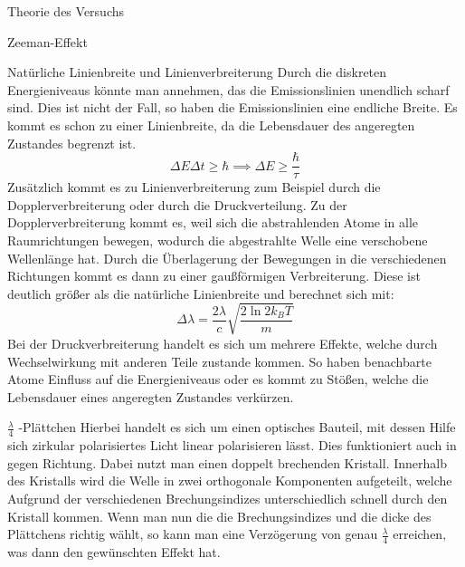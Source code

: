 \documentclass[pdftex, a4paper,11pt, twoside, ngerman]{report}
\begin{document}
\begin{chapter}{Theorie des Versuchs}
\begin{section}{Zeeman-Effekt}
      \begin{subsection}{Natürliche Linienbreite und Linienverbreiterung}
        Durch die diskreten Energieniveaus könnte man annehmen, das die
        Emissionslinien unendlich scharf sind. Dies ist nicht der Fall, so haben
        die Emissionslinien eine endliche Breite. Es kommt es schon zu einer
        Linienbreite, da die Lebensdauer des angeregten Zustandes begrenzt ist.
        \begin{equation}
          \label{eq:Linienbreite1}
          \Delta E\Delta t \geq \hbar \implies \Delta E \geq \frac \hbar\tau
        \end{equation}
        Zusätzlich kommt es zu Linienverbreiterung zum Beispiel durch die Dopplerverbreiterung oder durch die Druckverteilung.
        Zu der Dopplerverbreiterung kommt es, weil sich die abstrahlenden Atome
        in alle Raumrichtungen bewegen, wodurch die abgestrahlte Welle eine
        verschobene Wellenlänge hat. Durch die Überlagerung der Bewegungen in
        die verschiedenen Richtungen kommt es dann zu einer gaußförmigen
        Verbreiterung. Diese ist deutlich größer als die natürliche Linienbreite
        und berechnet sich mit:
        \begin{equation}
          \label{eq:Linienbreite2}
          \Delta\lambda = \frac{2\lambda}{c}\sqrt{\frac{2\ln 2k_B T}{m}}
        \end{equation}
        Bei der Druckverbreiterung handelt es sich um mehrere Effekte, welche
        durch Wechselwirkung mit anderen Teile zustande kommen. So haben
        benachbarte Atome Einfluss auf die Energieniveaus oder es kommt zu
        Stößen, welche die Lebensdauer eines angeregten Zustandes verkürzen.
        
        \end{subsection}
      
      
      
      \begin{subsection}{$\frac{\lambda}{4}$ -Plättchen}
        Hierbei handelt es sich um einen optisches Bauteil, mit dessen Hilfe
        sich zirkular polarisiertes Licht linear polarisieren lässt. Dies
        funktioniert auch in gegen Richtung. Dabei nutzt man einen doppelt
        brechenden Kristall. Innerhalb des Kristalls wird die Welle in zwei
        orthogonale Komponenten aufgeteilt, welche Aufgrund der verschiedenen
        Brechungsindizes unterschiedlich schnell durch den Kristall kommen.
        Wenn man nun die die Brechungsindizes und die dicke des Plättchens
        richtig wählt, so kann man eine Verzögerung von genau $\frac \lambda 4$
        erreichen, was dann den gewünschten Effekt hat.
        

\end{subsection}
\end{section}
\end{chapter}
\end{document}
